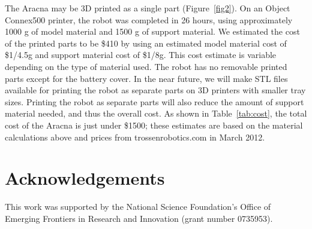 \documentclass[letterpaper]{article}
\begin{document}
The Aracna may be 3D printed as a single part (Figure~\ref{fig2}). On
an Object Connex500 printer, the robot was completed in 26 hours,
using approximately 1000 g of model material and 1500 g of support
material. We estimated the cost of the printed parts to be \$410 by
using an estimated model material cost of \$1/4.5g and support
material cost of \$1/8g. This cost estimate is variable depending on
the type of material used. The robot has no removable printed parts
except for the battery cover. In the near future, we will make STL files
available for printing the robot as separate parts on
3D printers with smaller tray sizes. Printing the robot as separate parts
will also reduce the amount of support material needed, and thus the
overall cost. As shown in Table~\ref{tab:cost}, the total cost of the
Aracna is just under \$1500; these estimates are based on the material
calculations above and prices from trossenrobotics.com in March 2012.

\begin{table}[h]
\vskip 0.25cm
\caption{Estimated total cost. A complete parts list is on our website \citep{WEB}.}
\label{tab:cost}
\end{table}



\section{Acknowledgements}

This work was supported by the National Science Foundation's Office of
Emerging Frontiers in Research and Innovation (grant number 0735953).


\footnotesize


\end{document}

